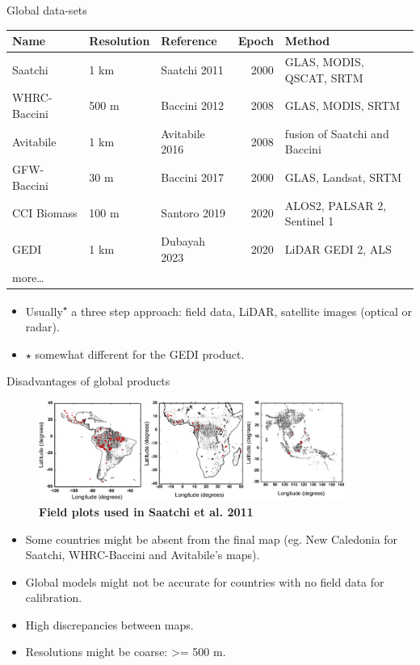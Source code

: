 \documentclass[10pt,table,dvipsnames,compress]{beamer}
\begin{document}
\begin{frame}[label={sec:orgbd0c798}]{Global data-sets}
\begin{center}
\footnotesize
\begin{tabular}{lllrl}
Name & Resolution & Reference & Epoch & Method\\[0pt]
\hline
Saatchi & 1 km & Saatchi 2011 & 2000 & GLAS, MODIS, QSCAT, SRTM\\[0pt]
WHRC-Baccini & 500 m & Baccini 2012 & 2008 & GLAS, MODIS, SRTM\\[0pt]
Avitabile & 1 km & Avitabile 2016 & 2008 & fusion of Saatchi and Baccini\\[0pt]
GFW-Baccini & 30 m & Baccini 2017 & 2000 & GLAS, Landsat, SRTM\\[0pt]
CCI Biomass & 100 m & Santoro 2019 & 2020 & ALOS2, PALSAR 2, Sentinel 1\\[0pt]
GEDI & 1 km & Dubayah 2023 & 2020 & LiDAR GEDI 2, ALS\\[0pt]
more\ldots{} &  &  &  & \\[0pt]
\end{tabular}
\end{center}

\begin{itemize}
\item Usually\textsuperscript{\(\star\)} a three step approach: field data, LiDAR, satellite images (optical or radar).
\item \(\star\) somewhat different for the GEDI product.
\end{itemize}
\end{frame}

\begin{frame}[label={sec:orgd0105ca}]{Disadvantages of global products}
\begin{figure}[htbp]
\centering
\includegraphics[width=10cm]{figs/carbon/data-saatchi.png}
\caption{\textbf{Field plots used in Saatchi et al. 2011}}
\end{figure}

\begin{itemize}
\item Some countries might be absent from the final map (eg. New Caledonia for Saatchi, WHRC-Baccini and Avitabile's maps).
\item Global models might not be accurate for countries with no field data for calibration.
\item High discrepancies between maps.
\item Resolutions might be coarse: >= 500 m.
\end{itemize}
\end{frame}
\end{document}
